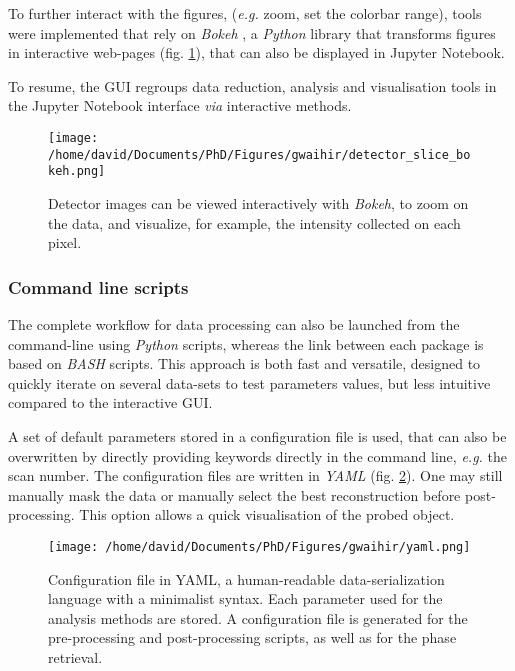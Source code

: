 To further interact with the figures, (\textit{e.g.} zoom, set the colorbar range), tools were implemented that rely on \textit{Bokeh} \parencite{Bokeh}, a \textit{Python} library that transforms figures in interactive web-pages (fig. \ref{fig:BokehDetector}), that can also be displayed in Jupyter Notebook.

To resume, the GUI regroups data reduction, analysis and visualisation tools in the Jupyter Notebook interface \textit{via} interactive methods.

\begin{figure}[!htb]
    \centering
    \texttt{[image: /home/david/Documents/PhD/Figures/gwaihir/detector\_slice\_bokeh.png]}
    \caption{Detector images can be viewed interactively with \textit{Bokeh}, to zoom on the data, and visualize, for example, the intensity collected on each pixel.}
    \label{fig:BokehDetector}
\end{figure}

\subsubsection{Command line scripts}

The complete workflow for data processing can also be launched from the command-line using \textit{Python} scripts, whereas the link between each package is based on \textit{BASH} scripts.
This approach is both fast and versatile, designed to quickly iterate on several data-sets to test parameters values, but less intuitive compared to the interactive GUI.

A set of default parameters stored in a configuration file is used, that can also be overwritten by directly providing keywords directly in the command line, \textit{e.g.} the scan number.
The configuration files are written in \textit{YAML} (fig. \ref{fig:YAML_file}).
One may still manually mask the data or manually select the best reconstruction before post-processing.
This option allows a quick visualisation of the probed object.

\begin{figure}[!htb]
    \centering
    \texttt{[image: /home/david/Documents/PhD/Figures/gwaihir/yaml.png]}
    \caption{
    Configuration file in YAML, a human-readable data-serialization language with a minimalist syntax.
    Each parameter used for the analysis methods are stored.
    A configuration file is generated for the pre-processing and post-processing scripts, as well as for the phase retrieval.
    }
    \label{fig:YAML_file}
\end{figure}

